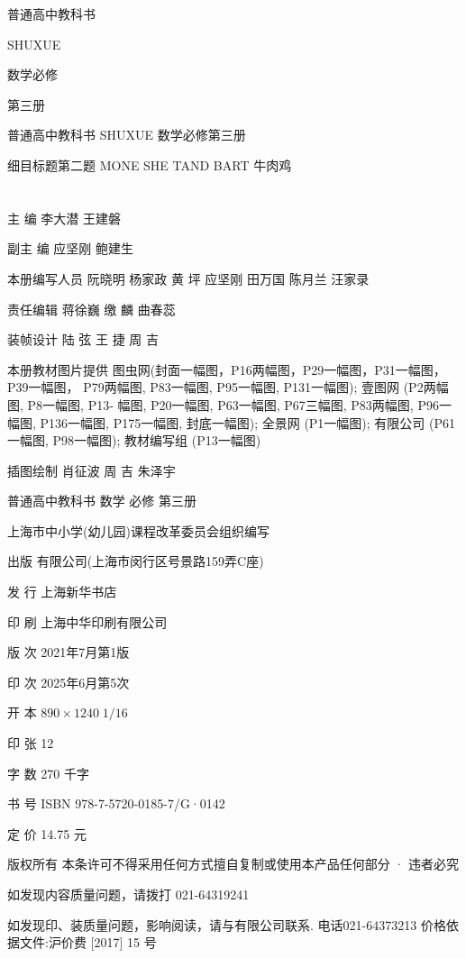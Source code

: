 \documentclass[10pt]{article}
\begin{document}
普通高中教科书

SHUXUE

数学必修

第三册





普通高中教科书 SHUXUE 数学必修第三册

细目标题第二题 MONE SHE TAND BART 牛肉鸡

\section*{}

主 编 李大潜 王建磐

副主 编 应坚刚 鲍建生

本册编写人员 阮晓明 杨家政 黄 坪 应坚刚 田万国 陈月兰 汪家录

责任编辑 蒋徐巍 缴 麟 曲春蕊

装帧设计 陆 弦 王 捷 周 吉

本册教材图片提供 图虫网(封面一幅图，P16两幅图，P29一幅图，P31一幅图，P39一幅图， P79两幅图, P83一幅图, P95一幅图, P131一幅图); 壹图网 (P2两幅图, P8一幅图, P13- 幅图, P20一幅图, P63一幅图, P67三幅图, P83两幅图, P96一幅图, P136一幅图, P175一幅图, 封底一幅图); 全景网 (P1一幅图); 有限公司 (P61一幅图, P98一幅图); 教材编写组 (P13一幅图)

插图绘制 肖征波 周 吉 朱泽宇

普通高中教科书 数学 必修 第三册

上海市中小学(幼儿园)课程改革委员会组织编写

出版 有限公司(上海市闵行区号景路159弄C座)

发 行 上海新华书店

印 刷 上海中华印刷有限公司

版 次 2021年7月第1版

印 次 2025年6月第5次

开 本 \({890} \times  {1240}\;1/{16}\)

印 张 12

字 数 270 千字

书 号 ISBN 978-7-5720-0185-7/G·0142

定 价 14.75 元

版权所有 本条许可不得采用任何方式擅自复制或使用本产品任何部分 · 违者必究

如发现内容质量问题，请拨打 021-64319241

如发现印、装质量问题，影响阅读，请与有限公司联系. 电话021-64373213 价格依据文件:沪价费 [2017] 15 号
\end{document}

